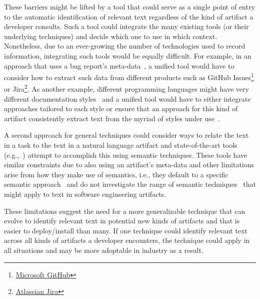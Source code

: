 These barriers might be lifted by a tool that could serve as a single point of entry to the automatic identification of relevant text regardless of the kind of artifact a developer consults.
Such a tool could integrate the many existing tools (or their underlying techniques) and decide which one 
to use in which context. Nonetheless, 
due to an ever-growing the number of technologies used to record information,
integrating such tools would be equally difficult.
For example, in an approach that uses a bug report's meta-data~\cite{Lotufo2012,li2018deep}, a 
unified tool would have to 
consider how to extract such data from different products 
such as 
GitHub Issues\footnote{\href{https://docs.github.com/en/issues/tracking-your-work-with-issues/about-issues}{Microsoft GitHub}} 
or Jira\footnote{\href{https://www.atlassian.com/software/jira}{Atlassian Jira}}.
As another example, different programming languages
might have very different documentation styles~\cite{endrikat2014} and a 
unified tool would have to either integrate approaches tailored to each style  
or ensure that an approach for this kind of artifact
consistently 
extract text from the myriad of styles under use~\cite{robillard2011field}.



A second approach for general techniques could consider ways to relate the text in a task 
to the text in a natural language artifact and  
state-of-the-art tools (e.g.,~\cite{Xu2017, silva2019}) attempt to accomplish this using semantic techniques.
These tools have similar constraints due to also using an artifact's meta-data and other limitations arise from how they make use of semantics,
i.e., they default to a specific semantic approach~\cite{Ye2016} and do not investigate the range of semantic techniques~\cite{Mikolov2013, Devlin2018Bert, fillmore1976frame} 
that might apply to text in software engineering artifacts.






These limitations suggest the need for a more generalizable technique
that can evolve to 
identify relevant text in potential new kinds of artifacts 
and that is easier to deploy/install than many.
If one technique could identify relevant text across all kinds
of artifacts a developer encounters, the technique
could apply in all situations and may be more adoptable in industry
as a result. 







